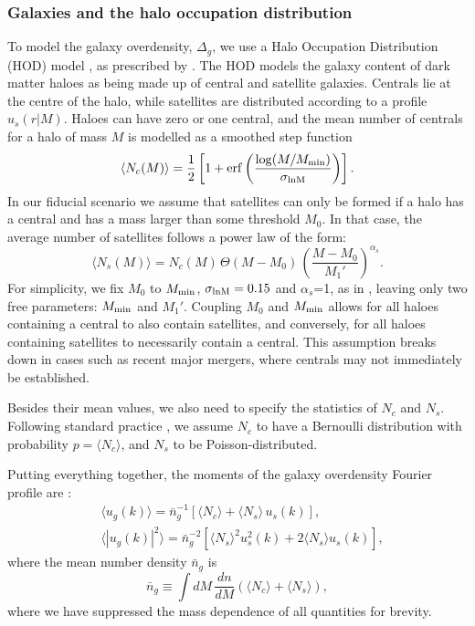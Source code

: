 \documentclass[useAMS,usenatbib]{mn2e}
\begin{document}
    \subsubsection{Galaxies and the halo occupation distribution}\label{sssec:theory.hm.hod}
      To model the galaxy overdensity, $\Delta_g$, we use a Halo Occupation Distribution (HOD) model \citep{2002ApJ...575..587B,2005ApJ...633..791Z,2013MNRAS.430..725V}, as prescribed by \cite{2011ApJ...736...59Z}. The HOD models the galaxy content of dark matter haloes as being made up of central and satellite galaxies. Centrals lie at the centre of the halo, while satellites are distributed according to a profile $u_s(r|M)$. Haloes can have zero or one central, and the mean number of centrals for a halo of mass $M$ is modelled as a smoothed step function
      \begin{equation}
        \langle N_c(M)\rangle=\frac{1}{2}\left[1+{\rm erf}\left(\frac{\log(M/M_{\rm min})}{\sigma_{\rm lnM}}\right)\right].
      \end{equation}
      In our fiducial scenario we assume that satellites can only be formed if a halo has a central and has a mass larger than some threshold $M_0$. In that case, the average number of satellites follows a power law of the form:
      \begin{equation}\label{eq:hod1}
        \langle N_s(M)\rangle=N_c(M)\,\Theta(M-M_0)\,\left(\frac{M-M_0}{M_1'}\right)^{\alpha_s}.
      \end{equation}
      For simplicity, we fix $M_0$ to $M_{\rm min}$, $\sigma_{\rm lnM}=0.15$ and $\alpha_s$=1, as in \cite{2018MNRAS.473.4318A}, leaving only two free parameters: $M_{\rm min}$ and $M_1'$. Coupling $M_0$ and $M_{\rm min}$ allows for all haloes containing a central to also contain satellites, and conversely, for all haloes containing satellites to necessarily contain a central. This assumption breaks down in cases such as recent major mergers, where centrals may not immediately be established.
      
      Besides their mean values, we also need to specify the statistics of $N_c$ and $N_s$. Following standard practice \citep{2013MNRAS.430..725V}, we assume $N_c$ to have a Bernoulli distribution with probability $p=\langle N_c\rangle$, and $N_s$ to be Poisson-distributed.

      Putting everything together, the moments of the galaxy overdensity Fourier profile are \citep[e.g. see section 2.2 of][]{2013MNRAS.430..725V}:
      \begin{align}
        &\langle u_g(k)\rangle=\bar{n}_g^{-1}\left[\langle N_c\rangle	+\langle N_s\rangle\,u_s(k)\right],\\
        &\langle |u_g(k)|^2\rangle=\bar{n}_g^{-2}\left[\langle N_s\rangle^2u_s^2(k)+2\langle N_s\rangle u_s(k)\right],
      \end{align}
      where the mean number density $\bar{n}_g$ is
      \begin{equation}
        \bar{n}_g\equiv\int dM\,\frac{dn}{dM}\left(\langle N_c\rangle+\langle N_s\rangle\right),
      \end{equation} 
      where we have suppressed the mass dependence of all quantities for brevity.
\end{document}
